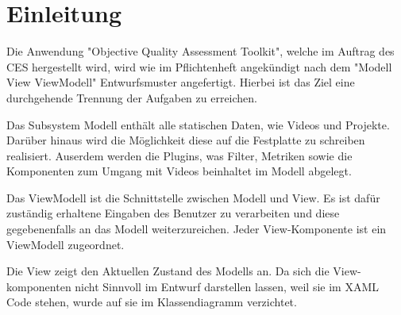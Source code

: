 \chapter{Einleitung}

Die Anwendung "Objective Quality Assessment Toolkit", welche im Auftrag des CES hergestellt wird, wird wie im Pflichtenheft angekündigt nach dem "Modell View ViewModell" Entwurfsmuster angefertigt.
Hierbei ist das Ziel eine durchgehende Trennung der Aufgaben zu erreichen.

Das Subsystem Modell enthält alle statischen Daten, wie Videos und Projekte. Darüber hinaus wird die  Möglichkeit diese auf die Festplatte zu schreiben realisiert. Auserdem werden die Plugins, was Filter, Metriken sowie die Komponenten zum Umgang mit Videos beinhaltet im Modell abgelegt.

Das ViewModell ist die Schnittstelle zwischen Modell und View. Es ist  dafür zuständig erhaltene Eingaben des Benutzer zu verarbeiten und diese gegebenenfalls an das Modell weiterzureichen. Jeder View-Komponente ist ein ViewModell zugeordnet.

Die View zeigt den Aktuellen Zustand des Modells an. Da sich die View-komponenten nicht Sinnvoll im Entwurf darstellen lassen, weil sie im XAML Code stehen, wurde auf sie im Klassendiagramm verzichtet.